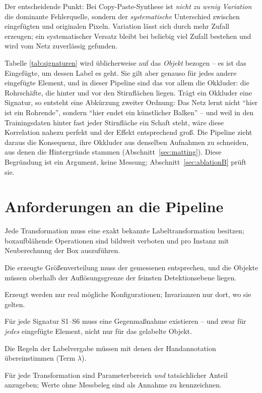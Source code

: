 Der entscheidende Punkt: Bei Copy-Paste-Synthese ist \emph{nicht zu wenig
Variation} die dominante Fehlerquelle, sondern der \emph{systematische}
Unterschied zwischen eingefügten und originalen Pixeln. Variation lässt sich
durch mehr Zufall erzeugen; ein systematischer Versatz bleibt bei beliebig viel
Zufall bestehen und wird vom Netz zuverlässig gefunden.

 Tabelle
\ref{tab:signaturen} wird üblicherweise auf das \emph{Objekt} bezogen -- es ist
das Eingefügte, um dessen Label es geht. Sie gilt aber genauso für jedes andere
eingefügte Element, und in dieser Pipeline sind das vor allem die Okkluder: die
Rohrschäfte, die hinter und vor den Stirnflächen liegen. Trägt ein Okkluder eine
Signatur, so entsteht eine Abkürzung zweiter Ordnung: Das Netz lernt nicht
\enquote{hier ist ein Rohrende}, sondern \enquote{hier endet ein künstlicher
Balken} -- und weil in den Trainingsdaten hinter fast jeder Stirnfläche ein
Schaft steht, wäre diese Korrelation nahezu perfekt und der Effekt entsprechend
groß. Die Pipeline zieht daraus die Konsequenz, ihre Okkluder aus denselben
Aufnahmen zu schneiden, aus denen die Hintergründe stammen
(Abschnitt~\ref{sec:matting}). Diese Begründung ist ein Argument, keine Messung;
Abschnitt~\ref{sec:ablationB} prüft sie.

\section{Anforderungen an die Pipeline}
\label{sec:anforderungen}

\begin{description}[leftmargin=1.2em,itemsep=1pt,font=\normalfont\bfseries]
  \item[A1 -- Labelexaktheit] Jede Transformation muss eine exakt bekannte
  Labeltransformation besitzen; boxaufblähende Operationen sind bildweit verboten
  und pro Instanz mit Neuberechnung der Box auszuführen.
  \item[A2 -- Kalibrierte Skala] Die erzeugte Größenverteilung muss der
  gemessenen entsprechen, und die Objekte müssen oberhalb der Auflösungsgrenze
  der feinsten Detektionsebene liegen.
  \item[A3 -- Physikalische Zulässigkeit] Erzeugt werden nur real mögliche
  Konfigurationen; Invarianzen nur dort, wo sie gelten.
  \item[A4 -- Geschlossene Abkürzungen] Für jede Signatur S1--S6 muss eine
  Gegenmaßnahme existieren -- und zwar für \emph{jedes} eingefügte Element, nicht
  nur für das gelabelte Objekt.
  \item[A5 -- Identische Labeldefinition] Die Regeln der Labelvergabe müssen mit
  denen der Handannotation übereinstimmen (Term $\lambda$).
  \item[A6 -- Dokumentierte Verteilung] Für jede Transformation sind
  Parameterbereich \emph{und} tatsächlicher Anteil anzugeben; Werte ohne
  Messbeleg sind als Annahme zu kennzeichnen.
\end{description}
